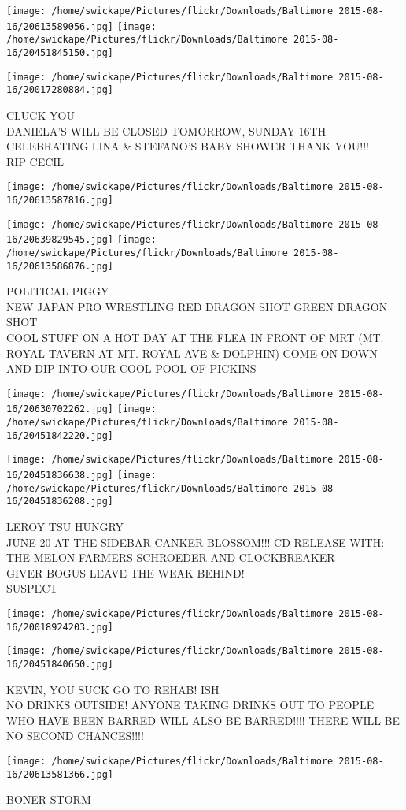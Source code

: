\documentclass[10pt,letterpaper]{article}
\begin{document}
\texttt{[image: /home/swickape/Pictures/flickr/Downloads/Baltimore 2015-08-16/20613589056.jpg]}
\texttt{[image: /home/swickape/Pictures/flickr/Downloads/Baltimore 2015-08-16/20451845150.jpg]}

\vspace{0.25in}
\texttt{[image: /home/swickape/Pictures/flickr/Downloads/Baltimore 2015-08-16/20017280884.jpg]}

CLUCK YOU\\
DANIELA'S WILL BE CLOSED TOMORROW, SUNDAY 16TH CELEBRATING LINA \& STEFANO'S BABY SHOWER THANK YOU!!!\\
RIP CECIL
\pagebreak

\texttt{[image: /home/swickape/Pictures/flickr/Downloads/Baltimore 2015-08-16/20613587816.jpg]}

\vspace{0.25in}
\texttt{[image: /home/swickape/Pictures/flickr/Downloads/Baltimore 2015-08-16/20639829545.jpg]}
\texttt{[image: /home/swickape/Pictures/flickr/Downloads/Baltimore 2015-08-16/20613586876.jpg]}

POLITICAL PIGGY\\
NEW JAPAN PRO WRESTLING RED DRAGON SHOT GREEN DRAGON SHOT\\
COOL STUFF ON A HOT DAY AT THE FLEA IN FRONT OF MRT (MT. ROYAL TAVERN AT MT. ROYAL AVE \& DOLPHIN) COME ON DOWN AND DIP INTO OUR COOL POOL OF PICKINS
\pagebreak

\texttt{[image: /home/swickape/Pictures/flickr/Downloads/Baltimore 2015-08-16/20630702262.jpg]}
\texttt{[image: /home/swickape/Pictures/flickr/Downloads/Baltimore 2015-08-16/20451842220.jpg]}

\texttt{[image: /home/swickape/Pictures/flickr/Downloads/Baltimore 2015-08-16/20451836638.jpg]}
\texttt{[image: /home/swickape/Pictures/flickr/Downloads/Baltimore 2015-08-16/20451836208.jpg]}

LEROY TSU HUNGRY\\
JUNE 20 AT THE SIDEBAR CANKER BLOSSOM!!! CD RELEASE WITH: THE MELON FARMERS SCHROEDER AND CLOCKBREAKER\\
GIVER BOGUS LEAVE THE WEAK BEHIND!\\
SUSPECT
\pagebreak

\texttt{[image: /home/swickape/Pictures/flickr/Downloads/Baltimore 2015-08-16/20018924203.jpg]}

\vspace{0.25in}
\texttt{[image: /home/swickape/Pictures/flickr/Downloads/Baltimore 2015-08-16/20451840650.jpg]}

KEVIN, YOU SUCK GO TO REHAB! ISH\\
NO DRINKS OUTSIDE!  ANYONE TAKING DRINKS OUT TO PEOPLE WHO HAVE BEEN BARRED WILL ALSO BE BARRED!!!! THERE WILL BE NO SECOND CHANCES!!!!
\pagebreak

\texttt{[image: /home/swickape/Pictures/flickr/Downloads/Baltimore 2015-08-16/20613581366.jpg]}

BONER STORM
\pagebreak
\end{document}
